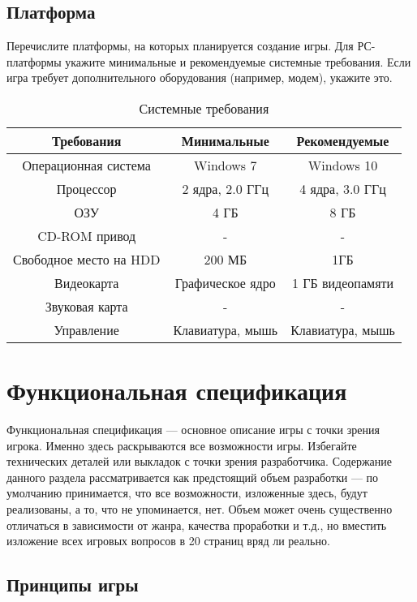 \documentclass[a4paper,12pt]{article}
\begin{document}
\subsection{Платформа}
Перечислите платформы, на которых планируется создание игры. Для РС-платформы укажите минимальные и рекомендуемые системные требования. Если игра требует дополнительного оборудования (например, модем), укажите это.  
\begin{table}[h!]
\centering
\begin{tabular}{|c|c|c|}
\hline

Требования & \textbf{Минимальные} & \textbf{Рекомендуемые} \\ \hline
Операционная система & Windows 7 & Windows 10\\ \hline
Процессор& 2 ядра, 2.0 ГГц & 4 ядра, 3.0 ГГц\\ \hline
ОЗУ& 4 ГБ& 8 ГБ\\ \hline
CD-ROM привод & - & - \\ \hline
Свободное место на HDD&200 МБ & 1ГБ\\ \hline
Видеокарта & Графическое ядро & 1 ГБ видеопамяти \\ \hline
Звуковая карта& - & - \\ \hline
Управление& Клавиатура, мышь & Клавиатура, мышь\\ \hline
\end{tabular}

\caption{Системные требования}
\label{tab:example_table}
\end{table}


\section{Функциональная спецификация}
Функциональная спецификация — основное описание игры с точки зрения игрока. Именно здесь раскрываются все возможности игры. Избегайте технических деталей или выкладок с точки зрения разработчика. Содержание данного раздела рассматривается как предстоящий объем разработки — по умолчанию принимается, что все возможности, изложенные здесь, будут реализованы, а то, что не упоминается, нет. Объем может очень существенно отличаться в зависимости от жанра, качества проработки и т.д., но вместить изложение всех игровых вопросов в 20 страниц вряд ли реально.

\subsection{Принципы игры}
\end{document}
